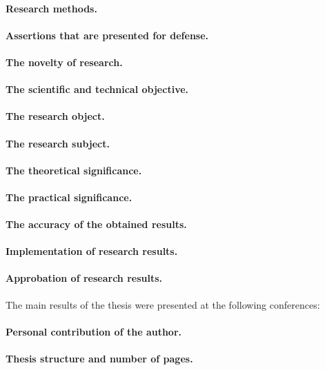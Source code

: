 \paragraph*{Research methods.}
\paragraph*{Assertions that are presented for defense.}
\paragraph*{The novelty of research.}
\paragraph*{The scientific and technical objective.}
\paragraph*{The research object.}
\paragraph*{The research subject.}
\paragraph*{The theoretical significance.}
\paragraph*{The practical significance.}
\paragraph*{The accuracy of the obtained results.}

\paragraph*{Implementation of research results.}
\paragraph*{Approbation of research results.}
The main results of the thesis were presented at the following conferences:
\printConferenceEN
\paragraph*{Personal contribution of the author.}
\paragraph*{Thesis structure and number of pages.}

